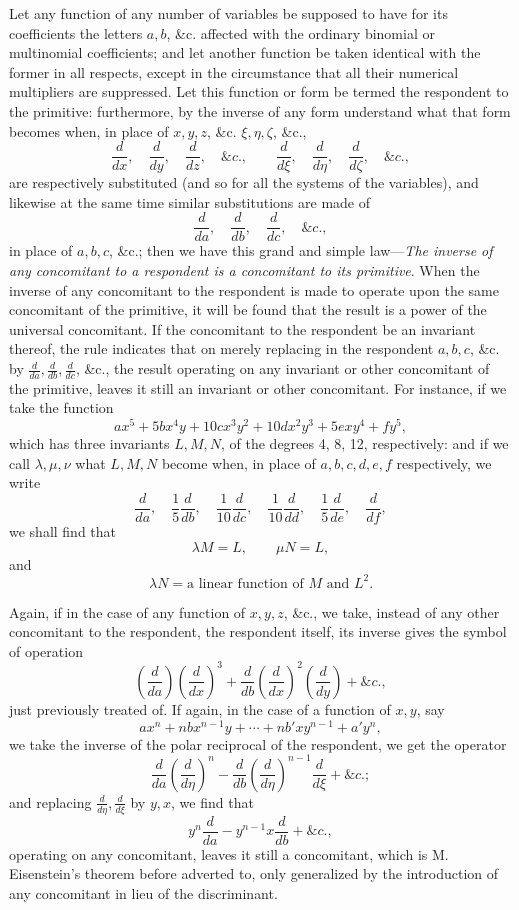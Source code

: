 \documentclass[11pt]{article}
\newcommand{\sourcepage}[1]{\marginpar{\scriptsize p.~#1}}
\begin{document}
{{Let any function of any number of variables be supposed to have for its coefficients the letters $a,b$, \&c. affected with the ordinary binomial or multinomial coefficients; and let another function be taken identical with the former in all respects, except in the circumstance that all their numerical multipliers are suppressed. Let this function or form be termed the respondent to the primitive: furthermore, by the inverse of any form understand what that form becomes when, in place of $x,y,z$, \&c. $\xi,\eta,\zeta$, \&c.,
\[
\frac{d}{dx},\quad \frac{d}{dy},\quad \frac{d}{dz},\quad \&c.,
\qquad
\frac{d}{d\xi},\quad \frac{d}{d\eta},\quad \frac{d}{d\zeta},\quad \&c.,
\]
are respectively substituted (and so for all the systems of the variables), and likewise at the same time similar substitutions are made of
\[
\frac{d}{da},\quad \frac{d}{db},\quad \frac{d}{dc},\quad \&c.,
\]
in place of $a,b,c$, \&c.; then we have this grand and simple law---\emph{The inverse of any concomitant to a respondent is a concomitant to its primitive}. When the inverse of any concomitant to the respondent is made to operate upon the same concomitant of the primitive, it will be found that the result is a power of the universal concomitant. If the concomitant to the respondent be an invariant thereof, the rule indicates that on merely replacing in the respondent $a,b,c$, \&c. by $\frac{d}{da},\frac{d}{db},\frac{d}{dc}$, \&c., the result operating on any invariant or other concomitant of the primitive, leaves it still an invariant or other concomitant. For instance, if we take the function
\[
ax^5+5bx^4y+10cx^3y^2+10dx^2y^3+5exy^4+fy^5,
\]
which has three invariants $L,M,N$, of the degrees 4, 8, 12, respectively: and if we call $\lambda,\mu,\nu$ what $L,M,N$ become when, in place of $a,b,c,d,e,f$ respectively, we write
\[
\frac{d}{da},\quad \frac15\frac{d}{db},\quad
\frac1{10}\frac{d}{dc},\quad \frac1{10}\frac{d}{dd},\quad
\frac15\frac{d}{de},\quad \frac{d}{df},
\]
we shall find that
\[
\lambda M=L,\qquad \mu N=L,
\]
and
\[
\lambda N=\text{a linear function of }M\text{ and }L^2.
\]

\sourcepage{341}
Again, if in the case of any function of $x,y,z$, \&c., we take, instead of any other concomitant to the respondent, the respondent itself, its inverse gives the symbol of operation
\[
\left(\frac{d}{da}\right)\left(\frac{d}{dx}\right)^3
+\frac{d}{db}\left(\frac{d}{dx}\right)^2\left(\frac{d}{dy}\right)+\&c.,
\]
just previously treated of. If again, in the case of a function of $x,y$, say
\[
ax^n+nbx^{n-1}y+\cdots+nb'xy^{n-1}+a'y^n,
\]
we take the inverse of the polar reciprocal of the respondent, we get the operator
\[
\frac{d}{da}\left(\frac{d}{d\eta}\right)^n
-\frac{d}{db}\left(\frac{d}{d\eta}\right)^{n-1}\frac{d}{d\xi}
+\&c.;
\]
and replacing $\frac{d}{d\eta},\frac{d}{d\xi}$ by $y,x$, we find that
\[
y^n\frac{d}{da}-y^{n-1}x\frac{d}{db}+\&c.,
\]
operating on any concomitant, leaves it still a concomitant, which is M. Eisenstein's theorem before adverted to, only generalized by the introduction of any concomitant in lieu of the discriminant.

}}
\end{document}
